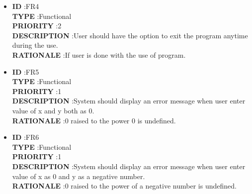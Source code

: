 \documentclass[a4paper,12pt]{article}
\begin{document}
\begin{itemize}
	
	\item \textbf{ID } \hspace{3cm} :FR4  \\
	\textbf{TYPE } \hspace{2.27cm}  :Functional\\
	\textbf{PRIORITY } \hspace{1.15cm} :2 \\
	\textbf{DESCRIPTION }\hspace{0.35cm} :User should have the option to exit the program anytime during the use. \\
	\textbf{RATIONALE } \hspace{0.75cm} :If user is done with the use of program.  \\
	
	
	\item \textbf{ID } \hspace{3cm} :FR5  \\
	\textbf{TYPE } \hspace{2.27cm}  :Functional\\
	\textbf{PRIORITY } \hspace{1.15cm} :1 \\
	\textbf{DESCRIPTION }\hspace{0.35cm} :System should display an error message when user enter value of x and y both as 0. \\
	\textbf{RATIONALE } \hspace{0.75cm} :0 raised to the power 0 is undefined.  \\
	
	
	\item \textbf{ID } \hspace{3cm} :FR6  \\
	\textbf{TYPE } \hspace{2.27cm}  :Functional\\
	\textbf{PRIORITY } \hspace{1.15cm} :1 \\
	\textbf{DESCRIPTION }\hspace{0.35cm} :System should display an error message when user enter value of x as 0 and y as a negative number. \\
	\textbf{RATIONALE } \hspace{0.75cm} :0 raised to the power of a negative number is undefined.  \\
	

\end{itemize}
\end{document}

